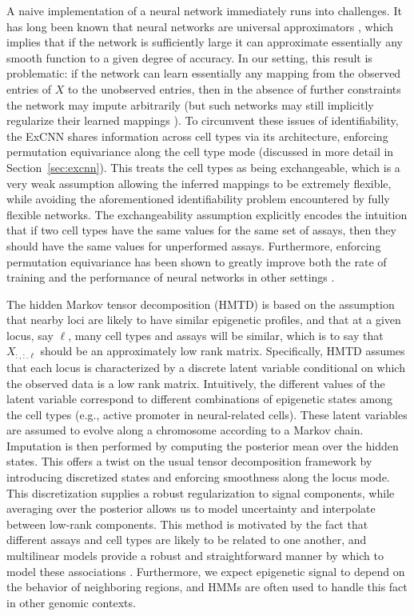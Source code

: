 \documentclass[11pt]{article}
\begin{document}
A naive implementation of a neural network immediately runs into challenges. It has long been known that neural networks are universal approximators \cite{cybenko1989approximation}, which implies that if the network is sufficiently large it can approximate essentially any smooth function to a given degree of accuracy. In our setting, this result is problematic: if the network can learn essentially any mapping from the observed entries of $X$ to the unobserved entries, then in the absence of further constraints the network may impute arbitrarily (but such networks may still implicitly regularize their learned mappings \cite{zhang2016understanding, ulyanov2018deep}). To circumvent these issues of identifiability, the ExCNN shares information across cell types via its architecture, enforcing permutation equivariance along the cell type mode (discussed in more detail in Section~\ref{sec:excnn}). This treats the cell types as being exchangeable, which is a very weak assumption allowing the inferred mappings to be extremely flexible, while avoiding the aforementioned identifiability problem encountered by fully flexible networks. The exchangeability assumption explicitly encodes the intuition that if two cell types have the same values for the same set of assays, then they should have the same values for unperformed assays. Furthermore, enforcing permutation equivariance has been shown to greatly improve both the rate of training and the performance of neural networks in other settings \cite{chan2018likelihood}.

The hidden Markov tensor decomposition (HMTD) is based on the assumption that nearby loci are likely to have similar epigenetic profiles, and that at a given locus, say $\ell$, many cell types and assays will be similar, which is to say that $X_{:, :. \ell}$ should be an approximately low rank matrix. Specifically, HMTD assumes that each locus is characterized by a discrete latent variable conditional on which the observed data is a low rank matrix. Intuitively, the different values of the latent variable correspond to different combinations of epigenetic states among the cell types (e.g., active promoter in neural-related cells). These latent variables are assumed to evolve along a chromosome according to a Markov chain. Imputation is then performed by computing the posterior mean over the hidden states. This offers a twist on the usual tensor decomposition framework by introducing discretized states and enforcing smoothness along the locus mode. This discretization supplies a robust regularization to signal components, while averaging over the posterior allows us to model uncertainty and interpolate between low-rank components. This method is motivated by the fact that different assays and cell types are likely to be related to one another, and multilinear models provide a robust and straightforward manner by which to model these associations \cite{durham2018predictd}. Furthermore, we expect epigenetic signal to depend on the behavior of neighboring regions, and HMMs are often used to handle this fact in other genomic contexts.
\end{document}
